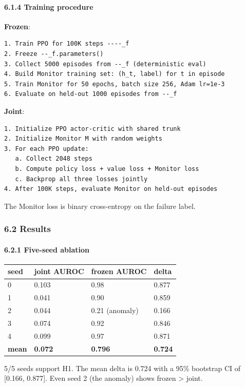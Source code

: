 \documentclass[11pt]{article}
\begin{document}
\paragraph{6.1.4 Training procedure}

\textbf{Frozen}:

\begin{verbatim}
1. Train PPO for 100K steps ----_f
2. Freeze --_f.parameters()
3. Collect 5000 episodes from --_f (deterministic eval)
4. Build Monitor training set: (h_t, label) for t in episode
5. Train Monitor for 50 epochs, batch size 256, Adam lr=1e-3
6. Evaluate on held-out 1000 episodes from --_f
\end{verbatim}

\textbf{Joint}:

\begin{verbatim}
1. Initialize PPO actor-critic with shared trunk
2. Initialize Monitor M with random weights
3. For each PPO update:
   a. Collect 2048 steps
   b. Compute policy loss + value loss + Monitor loss
   c. Backprop all three losses jointly
4. After 100K steps, evaluate Monitor on held-out episodes
\end{verbatim}

The Monitor loss is binary cross-entropy on the failure label.

\subsubsection{6.2 Results}

\paragraph{6.2.1 Five-seed ablation}

\begin{tabular}{llll}
seed & joint AUROC & frozen AUROC & delta \\
\hline
0 & 0.103 & 0.98 & 0.877 \\
1 & 0.041 & 0.90 & 0.859 \\
2 & 0.044 & 0.21 (anomaly) & 0.166 \\
3 & 0.074 & 0.92 & 0.846 \\
4 & 0.099 & 0.97 & 0.871 \\
\textbf{mean} & \textbf{0.072} & \textbf{0.796} & \textbf{0.724} \\
\end{tabular}


5/5 seeds support H1. The mean delta is 0.724 with a 95\% bootstrap CI of
[0.166, 0.877]. Even seed 2 (the anomaly) shows frozen > joint.
\end{document}
